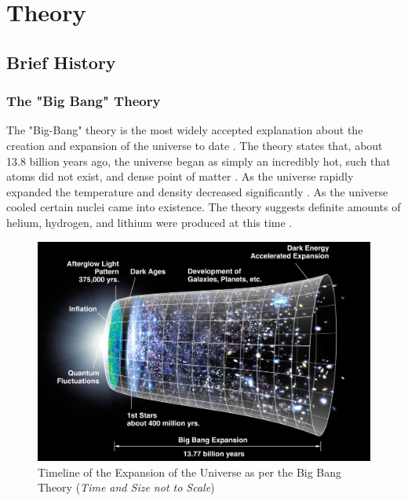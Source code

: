\documentclass[12pt]{article}
\begin{document}


\section{Theory}

\subsection{Brief History} \label{sec:1.1}

\subsubsection{The "Big Bang" Theory} \label{sec:1.1.1}

The "Big-Bang" theory is the most widely accepted explanation about the creation and \allowbreak expansion of the universe to date
\cite{britbigbang,spacebigbang}.
The theory states that, about 13.8 billion years ago, the universe began as simply an incredibly hot, such that atoms did not exist, 
and dense point of matter
\cite{britbigbang,spacebigbang,hubblebigbang}.
As the universe rapidly expanded the temperature and density decreased significantly
\cite{britbigbang,hubblebigbang}.
As the universe cooled certain nuclei came into existence. The theory suggests definite amounts of helium, hydrogen, and lithium were produced at this time
\cite{britbigbang}.

\begin{figure}[H]
    \centering
    \includegraphics[width=15cm]{bigbang.jpg}
    \caption{\centering \footnotesize{Timeline of the Expansion of the Universe as per the Big Bang Theory (\textit{Time and Size not to Scale})} \protect\cite{bigbangpic}}
    \label{fig:bigbang}
\end{figure}
\end{document}
